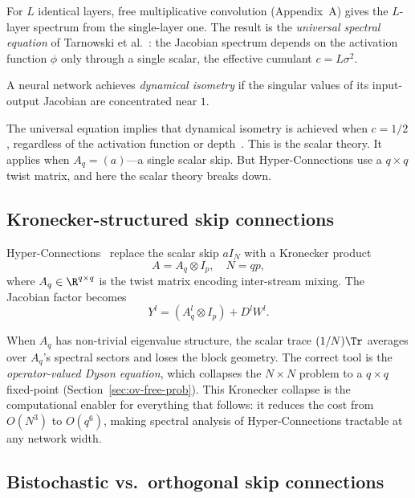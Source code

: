 For $L$ identical layers, free multiplicative convolution (Appendix~A) gives the $L$-layer spectrum from the single-layer one. The result is the \emph{universal spectral equation} of Tarnowski et al.~\cite{tarnowski2019dynamical}: the Jacobian spectrum depends on the activation function $\phi$ only through a single scalar, the effective cumulant $c = L\sigma^2$.

\begin{definition}\label{def:dynamical-isometry}
A neural network achieves \emph{dynamical isometry} if the singular values of its input-output Jacobian are concentrated near $1$.
\end{definition}

\noindent The universal equation implies that dynamical isometry is achieved when $c = 1/2$, regardless of the activation function or depth~\cite{tarnowski2019dynamical}. This is the scalar theory. It applies when $A_q = (a)$---a single scalar skip. But Hyper-Connections use a $q \times q$ twist matrix, and here the scalar theory breaks down.

\subsection{Kronecker-structured skip connections}\label{sec:kronecker-skip}

Hyper-Connections~\cite{zhu2024hyperconnections} replace the scalar skip $aI_N$ with a Kronecker product
\begin{equation}\label{eq:kronecker-skip}
A = A_q \otimes I_p, \quad N = qp,
\end{equation}
where $A_q \in \R^{q \times q}$ is the twist matrix encoding inter-stream mixing. The Jacobian factor becomes
\begin{equation}\label{eq:kronecker-layer}
Y^l = (A_q^l \otimes I_p) + D^l W^l.
\end{equation}

When $A_q$ has non-trivial eigenvalue structure, the scalar trace $(1/N)\Tr$ averages over $A_q$'s spectral sectors and loses the block geometry. The correct tool is the \emph{operator-valued Dyson equation}, which collapses the $N \times N$ problem to a $q \times q$ fixed-point (Section~\ref{sec:ov-free-prob}). This Kronecker collapse is the computational enabler for everything that follows: it reduces the cost from $O(N^3)$ to $O(q^6)$, making spectral analysis of Hyper-Connections tractable at any network width.

\subsection{Bistochastic vs.\ orthogonal skip connections}\label{sec:bistochastic-vs-ortho}

